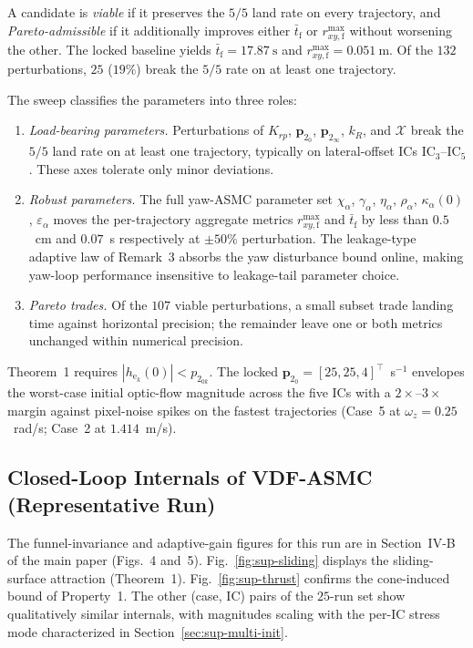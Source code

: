 \documentclass[10pt,journal]{IEEEtran}
\begin{document}
A candidate is \emph{viable} if it preserves the $5/5$ land rate on every trajectory, and \emph{Pareto-admissible} if it additionally improves either $\bar{t}_\text{f}$ or $r_{xy,\text{f}}^{\max}$ without worsening the other. The locked baseline yields $\bar{t}_\text{f}=17.87~\text{s}$ and $r_{xy,\text{f}}^{\max}=0.051~\text{m}$. Of the $132$ perturbations, $25$ ($19\%$) break the $5/5$ rate on at least one trajectory.

The sweep classifies the parameters into three roles:
\begin{enumerate}
    \item \emph{Load-bearing parameters.} Perturbations of $K_{rp}$, $\boldsymbol{p}_{2_0}$, $\boldsymbol{p}_{2_\infty}$, $k_R$, and $\mathcal{X}$ break the $5/5$ land rate on at least one trajectory, typically on lateral-offset ICs IC$_3$--IC$_5$. These axes tolerate only minor deviations.
    \item \emph{Robust parameters.} The full yaw-ASMC parameter set $\chi_\alpha$, $\gamma_\alpha$, $\eta_\alpha$, $\rho_\alpha$, $\kappa_\alpha(0)$, $\varepsilon_\alpha$ moves the per-trajectory aggregate metrics $r_{xy,\text{f}}^{\max}$ and $\bar{t}_\text{f}$ by less than $0.5$~cm and $0.07$~s respectively at $\pm 50\%$ perturbation. The leakage-type adaptive law of Remark~3 absorbs the yaw disturbance bound online, making yaw-loop performance insensitive to leakage-tail parameter choice.
    \item \emph{Pareto trades.} Of the $107$ viable perturbations, a small subset trade landing time against horizontal precision; the remainder leave one or both metrics unchanged within numerical precision.
\end{enumerate}

Theorem~1 requires $|h_{\text{e}_k}(0)|<p_{2_{0k}}$. The locked $\boldsymbol{p}_{2_0}=[25,25,4]^\top$~s$^{-1}$ envelopes the worst-case initial optic-flow magnitude across the five ICs with a $2\times$--$3\times$ margin against pixel-noise spikes on the fastest trajectories (Case~5 at $\omega_z=0.25$~rad/s; Case~2 at $1.414$~m/s).

\subsection{Closed-Loop Internals of VDF-ASMC (Representative Run)}
\label{sec:sup-internals}

The funnel-invariance and adaptive-gain figures for this run are in Section~IV-B of the main paper (Figs.~4 and~5). Fig.~\ref{fig:sup-sliding} displays the sliding-surface attraction (Theorem~1). Fig.~\ref{fig:sup-thrust} confirms the cone-induced bound of Property~1. The other (case, IC) pairs of the $25$-run set show qualitatively similar internals, with magnitudes scaling with the per-IC stress mode characterized in Section~\ref{sec:sup-multi-init}.
\end{document}
